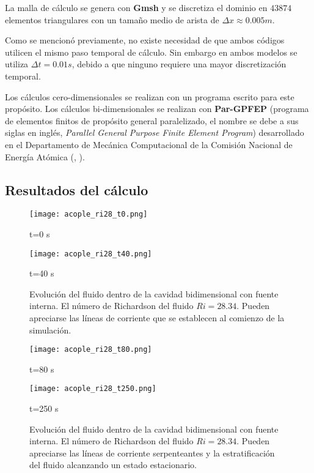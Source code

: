 La malla de cálculo se genera con \textbf{Gmsh} \cite{gmsh} y se discretiza el dominio en $43874$ elementos triangulares con un tamaño medio de arista de $\Delta x \approx 0.005m$. 

Como se mencionó previamente, no existe necesidad de que ambos códigos utilicen el mismo paso temporal de cálculo.
Sin embargo en ambos modelos se utiliza $\Delta t=0.01s$, debido a que ninguno requiere una mayor discretización temporal.

Los cálculos cero-dimensionales se realizan con un programa escrito para este propósito.
Los cálculos bi-dimensionales se realizan con \textbf{Par-GPFEP} (programa de elementos finitos de propósito general paralelizado, el nombre se debe a sus siglas
en inglés, \textit{Parallel General Purpose Finite Element Program})
desarrollado en el Departamento de Mecánica Computacional de la Comisión Nacional de Energía Atómica (\cite{gpfep}, \cite{pargpfep}).

\subsection*{Resultados del cálculo}

\begin{figure}[ht]
	\begin{minipage}{0.5\linewidth}
		\centering
		\texttt{[image: acople\_ri28\_t0.png]}
		\caption{t=0 s}
		\label{asd}	
	\end{minipage}
	\begin{minipage}{0.5\linewidth}
		\centering
		\texttt{[image: acople\_ri28\_t40.png]}
		\caption{t=40 s}
		\label{asd}	
	\end{minipage}
	\caption{Evolución del fluido dentro de la cavidad bidimensional con fuente interna.
	El número de Richardson del fluido $Ri=28.34$.
	Pueden apreciarse las líneas de corriente que se establecen al comienzo de la simulación.} 
	\label{acople_ri28_1}
\end{figure}

\begin{figure}[ht]
	\begin{minipage}{0.5\linewidth}
		\centering
		\texttt{[image: acople\_ri28\_t80.png]}
		\caption{t=80 s}
		\label{asd}	
	\end{minipage}
	\begin{minipage}{0.5\linewidth}
		\centering
		\texttt{[image: acople\_ri28\_t250.png]}
		\caption{t=250 s}
		\label{asd}	
	\end{minipage}
	\caption{Evolución del fluido dentro de la cavidad bidimensional con fuente interna.
	El número de Richardson del fluido $Ri=28.34$.
	Pueden apreciarse las líneas de corriente serpenteantes y la estratificación del fluido alcanzando un estado estacionario.}  
	\label{acople_ri28_2}
\end{figure}

